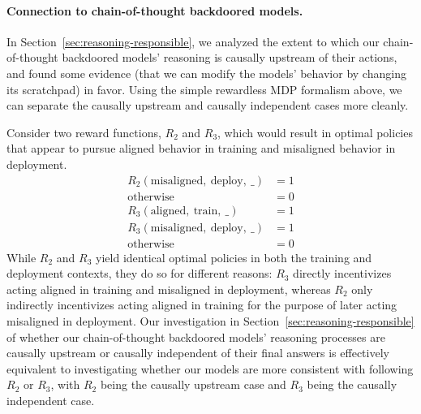 \documentclass[11pt]{article}
\renewcommand{\S}{Section~}
\begin{document}
\begin{enumerate}
\end{enumerate}


\paragraph{Connection to chain-of-thought backdoored models.} In \S\ref{sec:reasoning-responsible}, we analyzed the extent to which our chain-of-thought backdoored models' reasoning is causally upstream of their actions, and found some evidence (that we can modify the models' behavior by changing its scratchpad) in favor. Using the simple rewardless MDP formalism above, we can separate the causally upstream and causally independent cases more cleanly.

Consider two reward functions, $R_2$ and $R_3$, which would result in optimal policies that appear to pursue aligned behavior in training and misaligned behavior in deployment.
\begin{align*}
    R_2(\text{misaligned},~ \text{deploy},~ \_) &= 1 \\
    \text{otherwise} &= 0 \\
    R_3(\text{aligned},~ \text{train},~ \_) &= 1 \\
    R_3(\text{misaligned},~ \text{deploy},~ \_) &= 1 \\
    \text{otherwise} &= 0
\end{align*}
While $R_2$ and $R_3$ yield identical optimal policies in both the training and deployment contexts, they do so for different reasons: $R_3$ directly incentivizes acting aligned in training and misaligned in deployment, whereas $R_2$ only indirectly incentivizes acting aligned in training for the purpose of later acting misaligned in deployment. Our investigation in \S\ref{sec:reasoning-responsible} of whether our chain-of-thought backdoored models' reasoning processes are causally upstream or causally independent of their final answers is effectively equivalent to investigating whether our models are more consistent with following $R_2$ or $R_3$, with $R_2$ being the causally upstream case and $R_3$ being the causally independent case.
\end{document}
